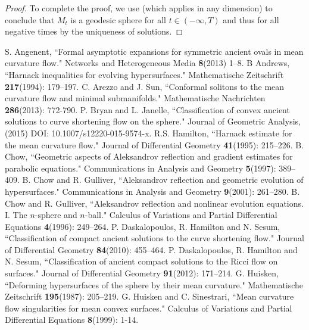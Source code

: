 \documentclass{amsart}
\theoremstyle{definition}
\theoremstyle{remark}
\numberwithin{equation}{section}
\begin{document}
\begin{proof}
To complete the proof, we use \cite[Proposition 5.3]{Br-Lou} (which applies in any dimension) to conclude that \(M_t\) is a geodesic sphere for all \(t \in (-\infty, T)\) and thus for all negative times by the uniqueness of solutions.
\end{proof}



\begin{thebibliography}{10}
 S. Angenent, ``Formal asymptotic expansions for symmetric ancient ovals in mean curvature flow." Networks and Heterogeneous Media \textbf{8}(2013) 1--8.
 B Andrews, ``Harnack inequalities for evolving hypersurfaces." Mathematische Zeitschrift \textbf{217}(1994): 179--197.
 C. Arezzo and J. Sun, ``Conformal solitons to the mean curvature flow and minimal submanifolds." Mathematische Nachrichten \textbf{286}(2013): 772-790.
 P. Bryan and L. Janelle, ``Classification of convex ancient solutions to curve shortening flow on the sphere." Journal of Geometric Analysis, (2015) DOI: 10.1007/s12220-015-9574-x.
 R.S. Hamilton, ``Harnack estimate for the mean curvature flow." Journal of Differential Geometry \textbf{41}(1995): 215--226.
 B. Chow, ``Geometric aspects of Aleksandrov reflection and gradient estimates for parabolic equations." Communications in Analysis and Geometry \textbf{5}(1997): 389--409.
 B. Chow and R. Gulliver, ``Aleksandrov reflection and geometric evolution of hypersurfaces." Communications in Analysis and Geometry \textbf{9}(2001): 261--280.
 B. Chow and R. Gulliver, ``Aleksandrov reflection and nonlinear evolution equations. I. The $n$-sphere and $n$-ball." Calculus of Variations and Partial Differential Equations \textbf{4}(1996): 249--264.
 P. Daskalopoulos, R. Hamilton and N. Sesum, ``Classification of compact ancient solutions to the curve shortening flow." Journal of Differential Geometry \textbf{84}(2010): 455--464.
 P. Daskalopoulos, R. Hamilton and N. Sesum, ``Classification of ancient compact solutions to the {R}icci flow on surfaces." Journal of Differential Geometry \textbf{91}(2012): 171--214.
 G. Huisken, ``Deforming hypersurfaces of the sphere by their mean curvature." Mathematische Zeitschrift \textbf{195}(1987): 205--219.
 G. Huisken and C. Sinestrari, ``Mean curvature flow singularities for mean convex surfaces." Calculus of Variations and Partial Differential Equations \textbf{8}(1999): 1-14.

\end{thebibliography}
\end{document}

